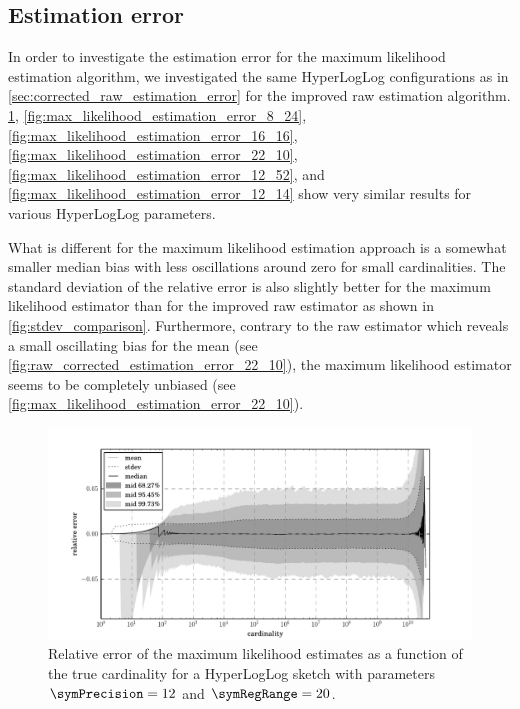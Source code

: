 \documentclass[a4paper]{scrartcl}
\begin{document}
\subsection{Estimation error}
\label{sec:maximum_likelihood_estimation_error}
In order to investigate the estimation error for the maximum likelihood estimation algorithm, we investigated the same HyperLogLog configurations as in \cref{sec:corrected_raw_estimation_error} for the improved raw estimation algorithm. \cref{fig:max_likelihood_estimation_error_12_20}, \cref{fig:max_likelihood_estimation_error_8_24},  \cref{fig:max_likelihood_estimation_error_16_16}, \cref{fig:max_likelihood_estimation_error_22_10}, \cref{fig:max_likelihood_estimation_error_12_52}, and \cref{fig:max_likelihood_estimation_error_12_14} show very similar results for various HyperLogLog parameters. 

What is different for the maximum likelihood estimation approach is a somewhat smaller median bias with less oscillations around zero for small cardinalities. The standard deviation of the relative error is also slightly better for the maximum likelihood estimator than for the improved raw estimator as shown in \cref{fig:stdev_comparison}. Furthermore, contrary to the raw estimator which reveals a small oscillating bias for the mean (see \cref{fig:raw_corrected_estimation_error_22_10}), the maximum likelihood estimator seems to be completely unbiased (see \cref{fig:max_likelihood_estimation_error_22_10}).

\begin{figure}
\centering
\includegraphics[width=1\textwidth]{max_likelihood_estimate_12_20}
\caption{Relative error of the maximum likelihood estimates as a function of the true cardinality for a HyperLogLog sketch with parameters $\symPrecision = 12$ and $\symRegRange=20$.}
\label{fig:max_likelihood_estimation_error_12_20}
\end{figure}
\end{document}
